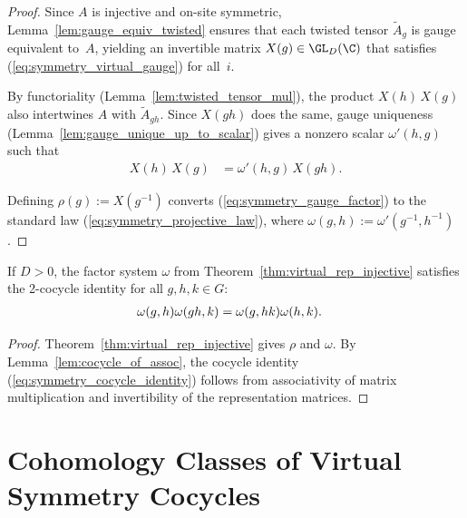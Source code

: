 \begin{proof}
    \leanok
    Since $A$ is injective and on-site symmetric,
    Lemma~\ref{lem:gauge_equiv_twisted} ensures that each twisted tensor
    $\widetilde{A}_g$ is gauge equivalent to~$A$, yielding an invertible
    matrix $X(g) \in \GL_{D}(\C)$ that satisfies
    (\ref{eq:symmetry_virtual_gauge}) for all~$i$.

    By functoriality (Lemma~\ref{lem:twisted_tensor_mul}), the product
    $X(h)\,X(g)$ also intertwines $A$ with $\widetilde{A}_{gh}$.
    Since $X(gh)$ does the same, gauge uniqueness
    (Lemma~\ref{lem:gauge_unique_up_to_scalar}) gives a nonzero scalar
    $\omega'(h,g)$ such that
    \begin{align}
        X(h)\,X(g)
         & =\omega'(h,g)\,X(gh).
        \label{eq:symmetry_gauge_factor}
    \end{align}

    Defining $\rho(g):=X(g^{-1})$ converts
    (\ref{eq:symmetry_gauge_factor}) to the standard law
    (\ref{eq:symmetry_projective_law}), where
    $\omega(g,h):=\omega'(g^{-1},h^{-1})$.
\end{proof}

\begin{corollary}%
    \label{cor:virtual_rep_cocycle}
    \leanok
    If $D > 0$, the factor system $\omega$ from
    Theorem~\ref{thm:virtual_rep_injective} satisfies the
    2-cocycle identity for all $g,h,k \in G$:
    \begin{align}
        \omega(g,h) \omega(gh,k)
         & =\omega(g,hk) \omega(h,k).
        \notag
    \end{align}
\end{corollary}

\begin{proof}
    \leanok
    Theorem~\ref{thm:virtual_rep_injective} gives $\rho$ and $\omega$.
    By Lemma~\ref{lem:cocycle_of_assoc}, the cocycle identity
    (\ref{eq:symmetry_cocycle_identity}) follows from associativity of
    matrix multiplication and invertibility of the representation matrices.
\end{proof}

\section{Cohomology Classes of Virtual Symmetry Cocycles}

